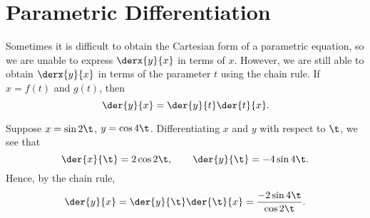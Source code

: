 \section{Parametric Differentiation}

Sometimes it is difficult to obtain the Cartesian form of a parametric equation, so we are unable to express $\derx{y}{x}$ in terms of $x$. However, we are still able to obtain $\derx{y}{x}$ in terms of the parameter $t$ using the chain rule. If $x = f(t)$ and $g(t)$, then \[\der{y}{x} = \der{y}{t} \der{t}{x}.\]

\begin{example}
    Suppose $x = \sin 2\t$, $y = \cos 4\t$. Differentiating $x$ and $y$ with respect to $\t$, we see that \[\der{x}{\t} = 2\cos 2\t, \qquad \der{y}{\t} = -4\sin 4\t.\] Hence, by the chain rule, \[\der{y}{x} = \der{y}{\t} \der{\t}{x} = \frac{-2 \sin 4\t}{\cos 2\t}.\]
\end{example}